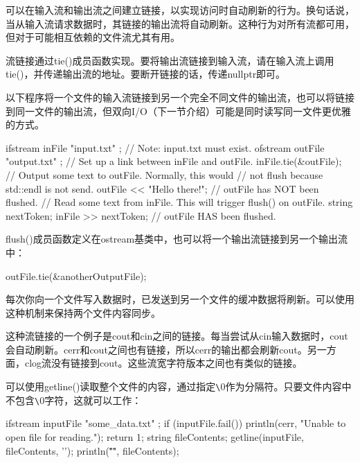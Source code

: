 可以在输入流和输出流之间建立链接，以实现访问时自动刷新的行为。换句话说，当从输入流请求数据时，其链接的输出流将自动刷新。这种行为对所有流都可用，但对于可能相互依赖的文件流尤其有用。

流链接通过tie()成员函数实现。要将输出流链接到输入流，请在输入流上调用tie()，并传递输出流的地址。要断开链接的话，传递nullptr即可。

以下程序将一个文件的输入流链接到另一个完全不同文件的输出流，也可以将链接到同一文件的输出流，但双向I/O（下一节介绍）可能是同时读写同一文件更优雅的方式。

\begin{cpp}
ifstream inFile { "input.txt" }; // Note: input.txt must exist.
ofstream outFile { "output.txt" };
// Set up a link between inFile and outFile.
inFile.tie(&outFile);
// Output some text to outFile. Normally, this would
// not flush because std::endl is not send.
outFile << "Hello there!";
// outFile has NOT been flushed.
// Read some text from inFile. This will trigger flush() on outFile.
string nextToken;
inFile >> nextToken;
// outFile HAS been flushed.
\end{cpp}

flush()成员函数定义在ostream基类中，也可以将一个输出流链接到另一个输出流中：

\begin{cpp}
outFile.tie(&anotherOutputFile);
\end{cpp}

每次你向一个文件写入数据时，已发送到另一个文件的缓冲数据将刷新。可以使用这种机制来保持两个文件内容同步。

这种流链接的一个例子是cout和cin之间的链接。每当尝试从cin输入数据时，cout会自动刷新。cerr和cout之间也有链接，所以cerr的输出都会刷新cout。另一方面，clog流没有链接到cout。这些流宽字符版本之间也有类似的链接。


可以使用getline()读取整个文件的内容，通过指定\verb|\|0作为分隔符。只要文件内容中不包含\verb|\|0字符，这就可以工作：

\begin{cpp}
ifstream inputFile { "some_data.txt" };
if (inputFile.fail()) {
    println(cerr, "Unable to open file for reading.");
    return 1;
}
string fileContents;
getline(inputFile, fileContents, '\0');
println("\"{}\"", fileContents);
\end{cpp}















